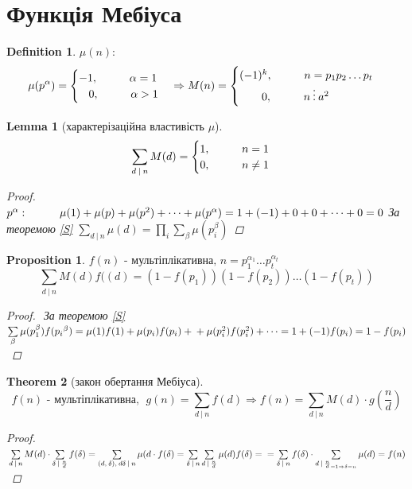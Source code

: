 \documentclass[a4paper,12pt, centered]{bookest}
\newtheorem{theorem}{Theorem}[section]
\newtheorem{lemma}[theorem]{Lemma}
\newtheorem{definition}{Definition}[section]
\newtheorem*{prop*}{Proposition}
\newcommand\tab[1][1cm]{\hspace*{#1}}
\begin{document}
\section{Функція Мебіуса}
\begin{definition}
	$\mu(n):$ $$\mu(p^\alpha)=\begin{cases}
		-1,\tab \alpha=1\\\>\>\>\>0,\tab\alpha>1
	\end{cases}\Rightarrow M(n)=\begin{cases}
		(-1)^k,\tab n=p_1p_2\dots p_t\\\>\>\>\>\>\>\>\>\>0,\tab n\>\vdots\>a^2
	\end{cases}$$
\end{definition}
\begin{lemma}[характерізаційна властивість $\mu$]
	$$\sum\limits_{d\>|\>n}M(d)=\begin{cases}
		1,\tab n=1\\0,\tab n\neq 1
	\end{cases}$$
	\begin{proof}
		$\\p^\alpha:\tab \mu(1)+\mu(p)	+\mu(p^2)+\dots+\mu(p^\alpha)=1+(-1)+0+0+\dots+0=0\\$ За теоремою \ref{S} $\sum\limits_{d\>|\>n}\mu(d)=\prod\limits_{i}\sum\limits_{\beta}\mu(p_i^\beta)$
	\end{proof}
\end{lemma}
\begin{prop*}
$f(n)\textrm{ - мультіплікативна, }n=p_1^{\alpha_1}\dots p_t^{\alpha_t}$
$$\sum\limits_{d\>|\>n}M(d)f((d)=(1-f(p_1))(1-f(p_2))\dots(1-f(p_t))$$
\begin{proof}$ $
	За теоремою \ref{S} $\sum\limits_{\beta}\mu(p_1^{\beta})f(p_i{^\beta})=\mu(1)f(1)+\mu(p_i)f(p_i)+\\+\mu(p_i^2)f(p_i^2)+\dots=1+(-1)f(p_i)=1-f(p_i)$
\end{proof}
\end{prop*}
\begin{theorem}[закон обертання Мебіуса]
	$$f(n) \textrm{ - мультіплікативна},\>\>g(n)	=\sum\limits_{d\>|\>n}f(d)\Rightarrow f(n)=\sum\limits_{d\>|\>n}M(d)\cdot g(\frac nd)$$
	\begin{proof}
		$\\\sum\limits_{d\>|\>n}M(d)\cdot\sum\limits_{\delta\>|\>\frac nd}f(\delta)=\sum\limits_{(d,\>\delta),\>d\delta\>|\>n}\mu(	d\cdot f(\delta)=\sum\limits_{\delta\>|\>n}\sum\limits_{d\>|\>\frac nd}\mu(d)f(\delta)=\\=\sum\limits_{\delta\>|\>n}f(\delta)\cdot\sum\limits_{d\>|\>\frac nd_{=1\Rightarrow\delta=n}}\mu(d)=f(n)$
	\end{proof}
\end{theorem}
\end{document}
